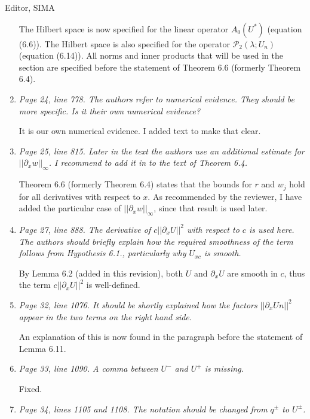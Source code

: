 \documentclass[11pt]{letter}
\begin{document}
\begin{letter}{Editor, SIMA}
\begin{enumerate}
The Hilbert space is now specified for the linear operator $A_0(U^*)$ (equation (6.6)). The Hilbert space is also specified for the operator $\mathcal{P}_2(\lambda; U_n)$ (equation (6.14)). All norms and inner products that will be used in the section are specified before the statement of Theorem 6.6 (formerly Theorem 6.4).

\item \emph{Page 24, line 778. The authors refer to numerical evidence. They should be more specific. Is it their own numerical evidence?}
\vspace{4mm}

It is our own numerical evidence. I added text to make that clear.

\item \emph{Page 25, line 815. Later in the text the authors use an additional estimate for $||\partial_x w||_\infty$. I recommend to add it in to the text of Theorem 6.4.}
\vspace{4mm}

Theorem 6.6 (formerly Theorem 6.4) states that the bounds for $r$ and $w_j$ hold for all derivatives with respect to $x$. As recommended by the reviewer, I have added the particular case of $||\partial_x w||_\infty$, since that result is used later.

\item \emph{Page 27, line 888. The derivative of $c||\partial_x U||^2$ with respect to $c$ is used here. The authors should briefly explain how the required smoothness of the term follows from Hypothesis 6.1., particularly why $U_{xc}$ is smooth.}
\vspace{4mm}

By Lemma 6.2 (added in this revision), both $U$ and $\partial_x U$ are smooth in $c$, thus the term $c||\partial_x U||^2$ is well-defined.

\item \emph{Page 32, line 1076. It should be shortly explained how the factors $||\partial_x Un||^2$ appear in the two terms on the right hand side.}
\vspace{4mm}

An explanation of this is now found in the paragraph before the statement of Lemma 6.11.

\item \emph{Page 33, line 1090. A comma between $U^-$ and $U^+$ is missing.}
\vspace{4mm}

Fixed.

\item \emph{Page 34, lines 1105 and 1108. The notation should be changed from $q^\pm$ to $U^\pm$.}
\vspace{4mm}


\end{enumerate}
\end{letter}
\end{document}
